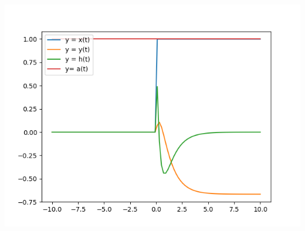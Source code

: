 \documentclass{beamer}
\begin{document}
\begin{frame}


   \includegraphics[scale = 0.7]{Graph.png}
    

\end{frame}
\end{document}
